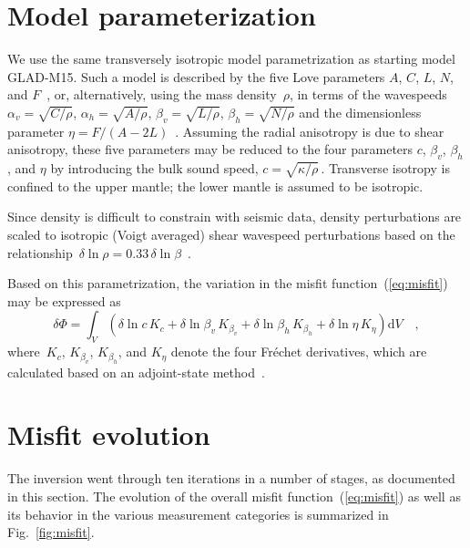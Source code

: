 \documentclass[extra,mreferee]{gji}
\begin{document}
\section{Model parameterization}
\label{section:parameterization}

We use the same transversely isotropic model parametrization as starting model GLAD-M15.
Such a model is described by the five Love parameters $A$, $C$, $L$, $N$, and $F$~\citep{Love27},
or, alternatively, using the mass density~$\rho$, in terms of the wavespeeds~$\alpha_v=\sqrt{C/\rho}$, $\alpha_h=\sqrt{A/\rho}$, $\beta_v=\sqrt{L/\rho}$, $\beta_h=\sqrt{N/\rho}$ and the dimensionless parameter $\eta=F/(A-2L)$~\citep{PREM,DT98}.
Assuming the radial anisotropy is due to shear anisotropy, these five parameters
may be reduced to the four parameters $c$, $\beta_v$, $\beta_h$, and $\eta$ by introducing the bulk sound speed,
$c=\sqrt{\kappa/\rho}$\,.
Transverse isotropy is confined to the upper mantle; the lower mantle is assumed to be isotropic.

Since density is difficult to constrain with seismic data,
density perturbations are scaled to isotropic (Voigt averaged) shear wavespeed perturbations based on the relationship~$\delta\ln\rho = 0.33\,\delta\ln\beta$~\citep{montagner1989petrological}.

Based on this parametrization,
the variation in the misfit function~(\ref{eq:misfit}) may be expressed as~\citep{zhu2015seismic,bozdaug2016global}
\begin{equation}
    \delta \Phi = \int_V
      (\delta \ln c\,K_c + \delta \ln\beta_v\,K_{\beta_v} + \delta \ln\beta_h\,K_{\beta_h} +
      \delta\ln\eta\,K_\eta) \mathrm{d}V
      \quad ,
\end{equation}
where~$K_c$, $K_{\beta_v}$, $K_{\beta_h}$, and $K_\eta$ denote the four Fr\'echet derivatives,
which are calculated based on an adjoint-state method~\citep[e.g.,][]{Plessix_2006_RAS,Tromp2005}.


\section{Misfit evolution}
\label{section:misfit_evolution}

The inversion went through ten iterations in a number of stages, as documented
in this section. The evolution of the overall misfit function~(\ref{eq:misfit})
as well as its behavior in the various measurement categories is summarized
in Fig.~\ref{fig:misfit}.
\end{document}
